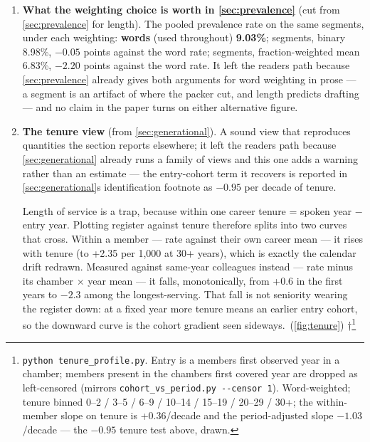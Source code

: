 \begin{enumerate}
  \begin{quote}
  \textbf{The two independent AI-guesses correlate} (screen vs grading judge,
  r = +0.758) --- a shared style signal across two different models, which is
  a caveat on reading either judge\textquotesingle s \texttt{ai\_guess} as ground truth, not on the
  DQI scores. Its bearing on the quality claim is tested in Appendix~\ref{app:robustness} and
  does not overturn the external-label result; the genre/era fixed effects in \cref{tab:dqi} control confounds between cells, which is a separate
  matter from leakage within a text.
  \end{quote}
\item
  \textbf{What the weighting choice is worth in \cref{sec:prevalence}} (cut from \cref{sec:prevalence} for length).
  The pooled prevalence rate on the same segments, under each weighting:
  \textbf{words} (used throughout) \textbf{9.03\%}; segments, binary 8.98\%, \(-0.05\) points
  against the word rate; segments, fraction-weighted mean 6.83\%, \(-2.20\) points
  against the word rate. It left the reader\textquotesingle s path because \cref{sec:prevalence} already gives
  both arguments for word weighting in prose --- a segment is an artifact of
  where the packer cut, and length predicts drafting --- and no claim in the
  paper turns on either alternative figure.
\item
  \textbf{The tenure view} (from \cref{sec:generational}). A sound view that reproduces quantities
  the section reports elsewhere; it left the reader\textquotesingle s path because \cref{sec:generational}
  already runs a family of views and this one adds a warning rather than an
  estimate --- the entry-cohort term it recovers is reported in \cref{sec:generational}\textquotesingle s
  identification footnote as \(-0.95\) per decade of tenure.

  Length of service is a trap, because within one career tenure = spoken
  year \(-\) entry year. Plotting register against tenure therefore splits into
  two curves that cross. Within a member --- rate against their own career
  mean --- it rises with tenure (to +2.35 per 1,000 at 30+ years), which is
  exactly the calendar drift redrawn. Measured against same-year colleagues
  instead --- rate minus its chamber \(\times\) year mean --- it falls, monotonically,
  from +0.6 in the first years to \(-2.3\) among the longest-serving. That fall
  is not seniority wearing the register down: at a fixed year more tenure
  means an earlier entry cohort, so the downward curve is the cohort
  gradient seen sideways.~(\cref{fig:tenure}) †\footnote{\texttt{python\ tenure\_\allowbreak{}profile.\allowbreak{}py}. Entry is a member\textquotesingle s first observed year in a chamber; members present in the chamber\textquotesingle s first covered year are dropped as left-censored (mirrors \texttt{cohort\_\allowbreak{}vs\_\allowbreak{}period.\allowbreak{}py\ -\allowbreak{}\/\allowbreak{}-\allowbreak{}censor\ 1}). Word-weighted; tenure binned 0--2 / 3--5 / 6--9 / 10--14 / 15--19 / 20--29 / 30+; the within-member slope on tenure is +0.36/decade and the period-adjusted slope \(-1.03\)/decade --- the \(-0.95\) tenure test above, drawn.}


\end{enumerate}
